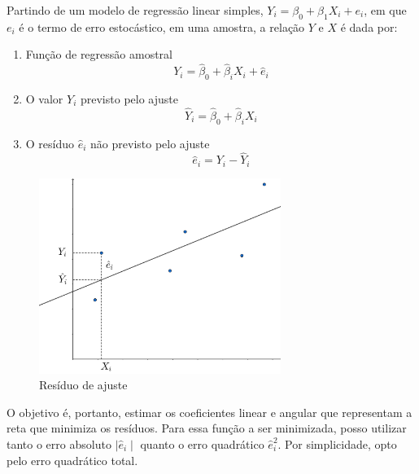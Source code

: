\documentclass[
  12pt,
  letterpaper,
  DIV=11,
  numbers=noendperiod]{scrartcl}
\begin{document}
Partindo de um modelo de regressão linear simples,
\(Y_i = \beta_0 + \beta_1X_i + e_i\), em que \(e_i\) é o termo de erro
estocástico, em uma amostra, a relação \(Y\) e \(X\) é dada por:

\begin{enumerate}
\def\labelenumi{\arabic{enumi}.}
\item
  Função de regressão amostral \begin{equation}
  Y_i = \hat{\beta}_0 + \hat{\beta}_iX_i + \hat{e}_i
  \end{equation}
\item
  O valor \(Y_i\) previsto pelo ajuste \begin{equation}
  \hat{Y}_i = \hat{\beta}_0 + \hat{\beta}_iX_i
  \end{equation}
\item
  O resíduo \(\hat{e}_i\) não previsto pelo ajuste \begin{equation}
  \hat{e}_i = Y_i - \hat{Y}_i
  \end{equation}
\end{enumerate}

\begin{figure}

{\centering \includegraphics[width=0.7\textwidth,height=\textheight]{img/appendix_b_1.png}

}

\caption{Resíduo de ajuste}

\end{figure}

O objetivo é, portanto, estimar os coeficientes linear e angular que
representam a reta que minimiza os resíduos. Para essa função a ser
minimizada, posso utilizar tanto o erro absoluto \(\mid \hat{e}_i \mid\)
quanto o erro quadrático \(\hat{e}_i^2\). Por simplicidade, opto pelo
erro quadrático total.
\end{document}
